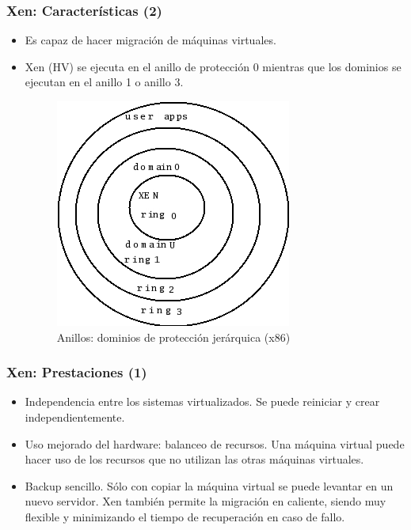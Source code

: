 \documentclass{beamer}
\begin{document}
\begin{frame}
\frametitle{Xen: Características (2)}

\begin{itemize}
\item Es capaz de hacer \alert{migración} de máquinas virtuales.
\item Xen (HV) se ejecuta en el anillo de protección 0 mientras que los dominios se ejecutan en el anillo 1 o anillo 3.

\begin{figure}
  \centering
\includegraphics[scale=0.40,clip=false]{figs/rings-xen.png}
  \caption{\footnotesize{Anillos: dominios de protección jerárquica (x86)}}
\end{figure}

\end{itemize}

\end{frame}



\begin{frame}
\frametitle{Xen: Prestaciones (1)}
\begin{itemize}

\item \alert{Independencia} entre los sistemas virtualizados. Se puede reiniciar y crear independientemente.
\item \alert{Uso mejorado del hardware}: balanceo de recursos. Una máquina virtual puede hacer uso de los recursos que no utilizan las otras máquinas virtuales.
\item \alert{Backup sencillo}. Sólo con copiar la máquina virtual se puede levantar en un nuevo servidor. Xen también permite la migración en caliente, siendo muy flexible y minimizando el tiempo de recuperación en caso de fallo.
\end{itemize}

\end{frame}
\end{document}
